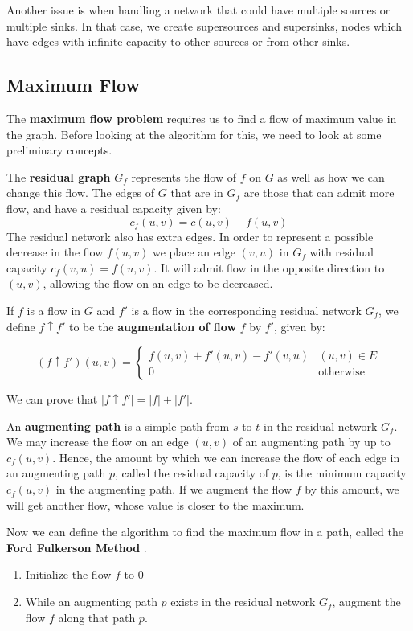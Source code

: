 \documentclass[12pt,letterpaper]{article}
\theoremstyle{definition}
\begin{document}
Another issue is when handling a network that could have multiple sources or multiple sinks. In that case, we create supersources and supersinks, nodes which have edges with infinite capacity to other sources or from other sinks.

\subsection{Maximum Flow}

The \textbf{maximum flow problem} requires us to find a flow of maximum value in the graph. Before looking at the algorithm for this, we need to look at some preliminary concepts.

The \textbf{residual graph} $G_f$ represents the flow of $f$ on $G$ as well as how we can change this flow. The edges of $G$ that are in $G_f$ are those that can admit more flow, and have a residual capacity given by:
\[c_f(u,v) = c(u,v) - f(u,v)\]
The residual network also has extra edges. In order to represent a possible decrease in the flow $f(u,v)$ we place an edge $(v,u)$ in $G_f$ with residual capacity $c_f(v,u) = f(u,v)$. It will admit flow in the opposite direction to $(u,v)$, allowing the flow on an edge to be decreased.

If $f$ is a flow in $G$ and $f'$ is a flow in the corresponding residual network $G_f$, we define $f \uparrow f'$ to be the \textbf{augmentation of flow} $f$ by $f'$, given by:

\[(f \uparrow f')(u,v) = \begin{cases}
  f(u,v) + f'(u,v) - f'(v,u) & (u,v) \in E \\
  0 & \text{otherwise}
\end{cases}\]

We can prove that $|f \uparrow f'| = |f| + |f'|$.

An \textbf{augmenting path} is a simple path from $s$ to $t$ in the residual network $G_f$. We may increase the flow on an edge $(u,v)$ of an augmenting path by up to $c_f(u,v)$. Hence, the amount by which we can increase the flow of each edge in an augmenting path $p$, called the residual capacity of $p$, is the minimum capacity $c_f(u,v)$ in the augmenting path. If we augment the flow $f$ by this amount, we will get another flow, whose value is closer to the maximum.

Now we can define the algorithm to find the maximum flow in a path, called the \textbf{Ford Fulkerson Method} .

\begin{enumerate}
  \item Initialize the flow $f$ to 0
  \item While an augmenting path $p$ exists in the residual network $G_f$, augment the flow $f$ along that path $p$.
\end{enumerate}
\end{document}
